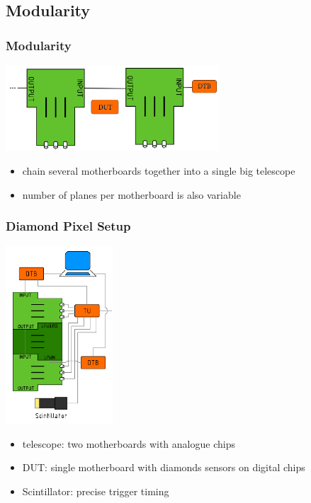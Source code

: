 \documentclass[9pt]{beamer}
\begin{document}
\subsection{Modularity}
\begin{frame}
	\frametitle{Modularity}
	\begin{center}
		\includegraphics[width=8cm]{Modul}
	\end{center}
	\begin{itemize}
		\item chain several motherboards together into a single big telescope
		\item number of planes per motherboard is also variable 
	\end{itemize}
\end{frame}
\begin{frame}
	\frametitle{Diamond Pixel Setup}
	\begin{minipage}{4cm}
		\centering
		\includegraphics[width=4cm]{fulltel_scint}
	\end{minipage}
	\hspace*{2pt}
	\begin{minipage}{7cm}
		\begin{itemize}
			\item telescope: two motherboards with analogue chips 
			\item DUT: single motherboard with diamonds sensors on digital chips
			\item Scintillator: precise trigger timing 
		\end{itemize}
	\end{minipage}
\end{frame}
\end{document}
